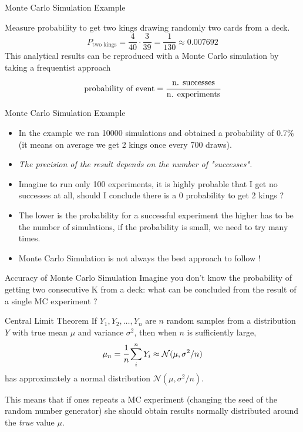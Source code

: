 \documentclass{beamer}
\begin{document}
\begin{frame}{Monte Carlo Simulation Example}
\begin{block}{}
Measure probability to get two kings drawing randomly two cards from a deck.
\begin{equation*}
P_\textrm{two kings} = \frac{4}{40} \cdot \frac{3}{39} = \frac{1}{130} \approx 0.007692
\end{equation*}
This analytical results can be reproduced with a Monte Carlo simulation by taking a frequentist approach
\begin{equation*}
\textrm{probability of event} = \cfrac{\textrm{n. successes}}{\textrm{n. experiments}}
\end{equation*}
\end{block}
\end{frame}

\begin{frame}{Monte Carlo Simulation Example}
\begin{itemize}
    \item In the example we ran 10000 simulations and obtained a probability of 0.7\% (it means on average we get 2 kings once every 700 draws).
    \item \emph{The precision of the result depends on the number of "successes".}
    \item Imagine to run only 100 experiments, it is highly probable that I get no successes at all, should I conclude there is a 0 probability to get 2 kings ?
    \item The lower is the probability for a successful experiment the higher has to be the number of simulations, if the probability is small, we need to try many times.
    \item Monte Carlo Simulation is not always the best approach to follow !
\end{itemize}
\end{frame}

\begin{frame}{Accuracy of Monte Carlo Simulation}
Imagine you don't know the probability of getting two consecutive K from a deck: what can be concluded from the result of a single MC experiment ?
\begin{block}{Central Limit Theorem}    
If $Y_1, Y_2,\dots, Y_n$ are $n$ random samples from a distribution $Y$ with true mean $\mu$ and variance $\sigma^{2}$, then when $n$ is sufficiently large, 
\begin{equation*}
\mu_n = \cfrac{1}{n}\sum_i^n Y_i \approx \mathcal{N}(\mu, \sigma^2/n)
\end{equation*}
has approximately a normal distribution $\mathcal{N}(\mu, \sigma^2/n)$. 

This means that if ones repeats a MC experiment (changing the seed of the random number generator) she should obtain results normally distributed around the \emph{true} value $\mu$.
\end{block}
\end{frame}
\end{document}
